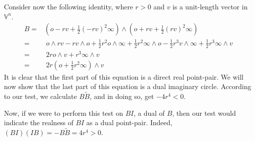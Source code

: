 \documentclass[12pt]{article}
\newcommand{\V}{\mathbb{V}}
\newcommand{\nvao}{o}
\newcommand{\nvai}{\infty}
\begin{document}
Consider now the following identity, where $r>0$ and $v$ is a unit-length vector in $\V^n$.
\begin{align*}
  B=& \left(\nvao-rv+\frac{1}{2}(-rv)^2\nvai\right)\wedge\left(\nvao+rv+\frac{1}{2}(rv)^2\nvai\right) \\
 =&\; \nvao\wedge rv-rv\wedge\nvao+\frac{1}{2}r^2\nvao\wedge\nvai+\frac{1}{2}r^2\nvai\wedge\nvao
-\frac{1}{2}r^3v\wedge\nvai+\frac{1}{2}r^3\nvai\wedge v \\
 =&\; 2ro\wedge v+r^3\nvai\wedge v \\
 =&\; 2r(\nvao+\frac{1}{2}r^2\nvai)\wedge v
\end{align*}
It is clear that the first part of this equation is a direct real point-pair.  We will now show that
the last part of this equation is a dual imaginary circle.  According to our test, we calculate $B\tilde{B}$,
and in doing so, get $-4r^4<0$.

Now, if we were to perform this test on $BI$, a dual of $B$, then our test would indicate the realness
of $BI$ as a dual point-pair.  Indeed, $(BI)(IB)=-B\tilde{B}=4r^4>0$.
\end{document}
